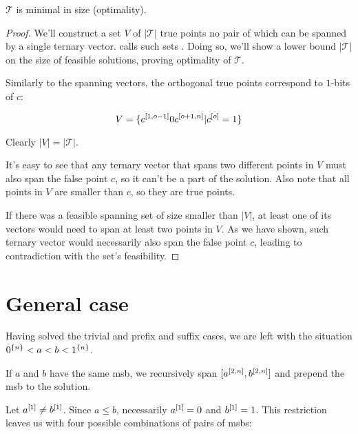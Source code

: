 \begin{theorem}
$\mathcal{T}$ is minimal in size (optimality).
\end{theorem}

\begin{proof}
We'll construct a set $V$ of $|\mathcal{T}|$ true points
no pair of which can be spanned by a single ternary vector.
\dubovsky{}\cite{Dubovsky2012} calls such sets
.
Doing so, we'll show a lower bound $|\mathcal{T}|$
on the size of feasible solutions,
proving optimality of $\mathcal{T}$.

Similarly to the spanning vectors,
the orthogonal true points correspond to $1$-bits of $c$:

\begin{equation}
V =
\{c^{[1, o - 1]} 0 c^{[o + 1, n]} |
c^{[o]} = 1\}
\end{equation}

Clearly $|V| = |\mathcal{T}|$.

It's easy to see that any ternary vector that spans two
different points in $V$ must also span the false point $c$,
so it can't be a part of the solution.
Also note that all points in $V$ are smaller than $c$,
so they are true points.

If there was a feasible spanning set
of size smaller than $|V|$,
at least one of its vectors would need to span at least
two points in $V$.
As we have shown, such ternary vector would necessarily
also span the false point $c$,
leading to contradiction with the set's feasibility.
\end{proof}

\section{General case}

Having solved the trivial and prefix and suffix cases,
we are left with the situation
$0^{\{n\}} < a < b < 1^{\{n\}}$.

If $a$ and $b$ have the same \acrshort{msb},
we recursively span
$[a^{[2, n]}, b^{[2, n]}]$
and prepend the \acrshort{msb}
to the solution.

Let $a^{[1]} \neq b^{[1]}$.
Since $a \leq b$,
necessarily $a^{[1]} = 0$
and $b^{[1]} = 1$.
This restriction leaves us with
four possible combinations of pairs
of \acrshort{msb}s:

